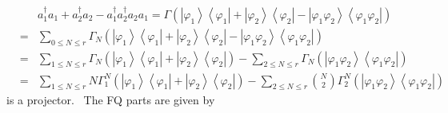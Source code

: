 \documentclass[12pt]{article}
\begin{document}
\begin{eqnarray*}
&&a_{1}^{\dagger }a_{1}+a_{2}^{\dagger }a_{2}-a_{1}^{\dagger }a_{2}^{\dagger
}a_{2}a_{1}=\Gamma \left( \left\vert \varphi _{1}\right\rangle \left\langle
\varphi _{1}\right\vert +\left\vert \varphi _{2}\right\rangle \left\langle
\varphi _{2}\right\vert -\left\vert \varphi _{1}\varphi _{2}\right\rangle
\left\langle \varphi _{1}\varphi _{2}\right\vert \right) \\
&=&\sum_{0\leq N\leq r}\Gamma _{N}\left( \left\vert \varphi
_{1}\right\rangle \left\langle \varphi _{1}\right\vert +\left\vert \varphi
_{2}\right\rangle \left\langle \varphi _{2}\right\vert -\left\vert \varphi
_{1}\varphi _{2}\right\rangle \left\langle \varphi _{1}\varphi
_{2}\right\vert \right) \\
&=&\sum_{1\leq N\leq r}\Gamma _{N}\left( \left\vert \varphi
_{1}\right\rangle \left\langle \varphi _{1}\right\vert +\left\vert \varphi
_{2}\right\rangle \left\langle \varphi _{2}\right\vert \right) -\sum_{2\leq
N\leq r}\Gamma _{N}\left( \left\vert \varphi _{1}\varphi _{2}\right\rangle
\left\langle \varphi _{1}\varphi _{2}\right\vert \right) \\
&=&\sum_{1\leq N\leq r}N\Gamma _{1}^{N}\left( \left\vert \varphi
_{1}\right\rangle \left\langle \varphi _{1}\right\vert +\left\vert \varphi
_{2}\right\rangle \left\langle \varphi _{2}\right\vert \right) -\sum_{2\leq
N\leq r}\binom{N}{2}\Gamma _{2}^{N}\left( \left\vert \varphi _{1}\varphi
_{2}\right\rangle \left\langle \varphi _{1}\varphi _{2}\right\vert \right)
\end{eqnarray*}%
is a projector. \ The FQ parts are given by 
\end{document}
